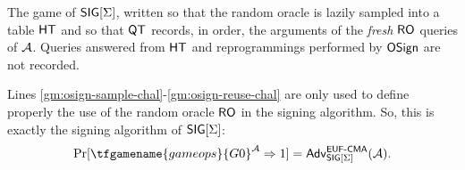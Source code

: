 The \EUFCMA game of $\mathsf{SIG}[\Sigma]$, written so that the random oracle is
lazily sampled into a table $\mathsf{HT}$ and so that $\mathsf{QT}$ records, in order, the
arguments of the \emph{fresh} $\mathsf{RO}$ queries of $\mathcal{A}$. Queries answered from
$\mathsf{HT}$ and reprogrammings performed by $\mathsf{OSign}$ are not recorded.

Lines \ref{gm:osign-sample-chal}-\ref{gm:osign-reuse-chal} are only used to define properly the use of the random oracle $\mathsf{RO}$ in the signing algorithm.
So, this is exactly the signing algorithm of $\mathsf{SIG}[\Sigma]$:
\begin{equation}\label{eq:g0}
    \Pr[\tfgamename{gameops}{G0}^\adv \Rightarrow 1]
    = \Advantage{\EUFCMA}{\SIG[\Sigma]}(\adv).
\end{equation}

